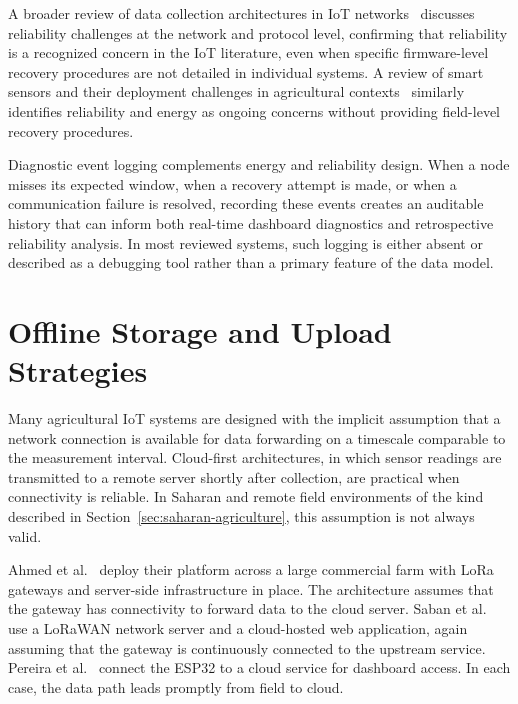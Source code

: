 A broader review of data collection architectures in IoT
networks~\cite{abbaari2024data_collection_iot_networks} discusses reliability
challenges at the network and protocol level, confirming that reliability is a
recognized concern in the IoT literature, even when specific firmware-level
recovery procedures are not detailed in individual
systems.
A review of smart sensors and their deployment challenges in agricultural
contexts~\cite{rajak2023iot_smart_sensors_agriculture} similarly identifies
reliability and energy as ongoing concerns without providing field-level
recovery
procedures.

Diagnostic event logging complements energy and reliability design. When a
node misses its expected window, when a recovery attempt is made, or when a
communication failure is resolved, recording these events creates an auditable
history that can inform both real-time dashboard diagnostics and retrospective
reliability analysis. In most reviewed systems, such logging is either absent
or described as a debugging tool rather than a primary feature of the data
model.

\section{Offline Storage and Upload Strategies}
\label{sec:offline-storage}

Many agricultural IoT systems are designed with the implicit assumption that
a network connection is available for data forwarding on a timescale
comparable to the measurement interval. Cloud-first architectures, in which
sensor readings are transmitted to a remote server shortly after collection,
are practical when connectivity is reliable. In Saharan and remote field
environments of the kind described in Section~\ref{sec:saharan-agriculture},
this assumption is not always valid.

Ahmed et al.~\cite{ahmed2022lora_agriculture_chile} deploy their platform
across a large commercial farm with LoRa gateways and server-side
infrastructure in place. The architecture assumes that the gateway has
connectivity to forward data to the cloud server. Saban et
al.~\cite{saban2023smart_agricultural_lora_cloud} use a LoRaWAN network server
and a cloud-hosted web application, again assuming that the gateway is
continuously connected to the upstream service. Pereira et
al.~\cite{pereira2023esp32_drip_irrigation} connect the ESP32 to a cloud
service for dashboard access. In each case, the data path leads promptly from
field to cloud.

